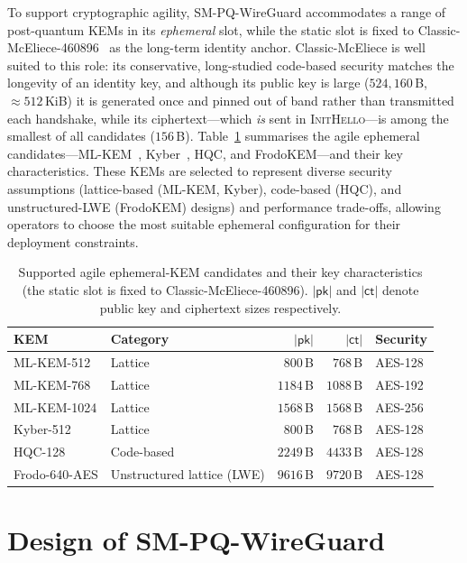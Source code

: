 \documentclass{SCIS2026}
\newcommand{\initmsg}{\textsc{InitHello}\xspace}
\begin{document}
To support cryptographic agility, SM-PQ-WireGuard accommodates a
range of post-quantum KEMs in its \emph{ephemeral} slot, while the
static slot is fixed to Classic-McEliece-460896~\cite{16} as the
long-term identity anchor.  Classic-McEliece is well suited to this
role: its conservative, long-studied code-based security matches the
longevity of an identity key, and although its public key is large
($524{,}160$\,B, $\approx512$\,KiB) it is generated once and pinned out
of band rather than transmitted each handshake, while its
ciphertext---which \emph{is} sent in \initmsg---is among the smallest of
all candidates ($156$\,B).
Table~\ref{tab:kems} summarises the agile ephemeral
candidates---ML-KEM~\cite{15}, Kyber~\cite{29}, HQC, and
FrodoKEM---and their key characteristics.  These KEMs are selected to represent diverse
security assumptions (lattice-based (ML-KEM, Kyber), code-based (HQC), and unstructured-LWE (FrodoKEM) designs) and performance trade-offs, allowing
operators to choose the most suitable ephemeral configuration for their
deployment constraints.

\begin{table}[htbp]
\centering
\caption{Supported agile ephemeral-KEM candidates and their key
characteristics (the static slot is fixed to Classic-McEliece-460896).
$|\textsf{pk}|$ and $|\textsf{ct}|$ denote public
key and ciphertext sizes respectively.}
\label{tab:kems}
\footnotesize
\tabcolsep 5pt
\begin{tabular}{llrrl}
\toprule
\textbf{KEM} & \textbf{Category} & $|\textsf{pk}|$ & $|\textsf{ct}|$ & \textbf{Security} \\
\midrule
ML-KEM-512    & Lattice            & $800$\,B  & $768$\,B  & AES-128 \\
ML-KEM-768    & Lattice            & $1184$\,B & $1088$\,B & AES-192 \\
ML-KEM-1024   & Lattice            & $1568$\,B & $1568$\,B & AES-256 \\
Kyber-512     & Lattice            & $800$\,B  & $768$\,B  & AES-128 \\
HQC-128       & Code-based         & $2249$\,B & $4433$\,B & AES-128 \\
Frodo-640-AES & Unstructured lattice (LWE) & $9616$\,B & $9720$\,B & AES-128 \\
\bottomrule
\end{tabular}
\end{table}


\section{Design of SM-PQ-WireGuard}
\label{sec:design}
\end{document}
